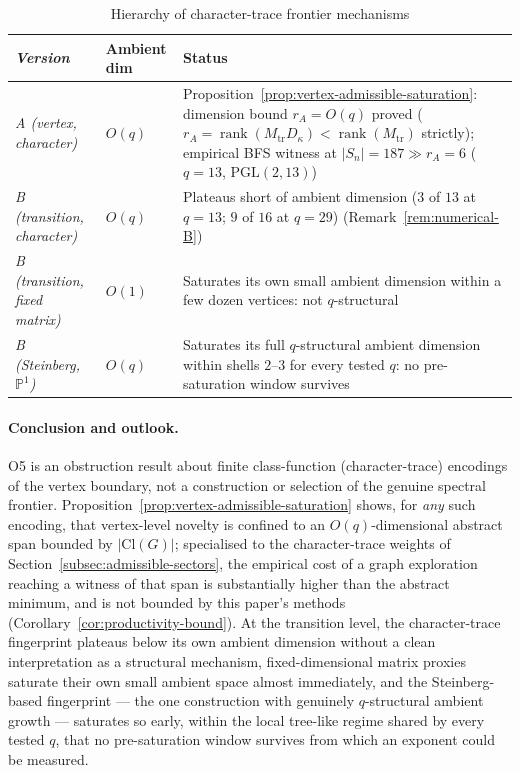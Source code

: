 \documentclass[11pt,a4paper]{article}
\theoremstyle{plain}
\theoremstyle{definition}
\theoremstyle{remark}
\newcommand{\Cl}{\mathrm{Cl}}
\newcommand{\rank}{\operatorname{rank}}
\newcommand{\adm}{\mathrm{tr}}
\begin{document}
      \begin{table}[ht]
        \centering
        \caption{Hierarchy of character-trace frontier mechanisms}
        \label{tab:mechanisms}
        \begin{tabular}{>{\itshape}l l p{7.5cm}}
          \toprule
          Version & Ambient dim & Status \\
          \midrule
          A (vertex, character) & $O(q)$ &
          Proposition~\ref{prop:vertex-admissible-saturation}: dimension bound $r_A=O(q)$ proved
          ($r_A=\rank(M_{\adm}D_\kappa) < \rank(M_{\adm})$ strictly);
          empirical BFS witness at $|S_n|=187 \gg r_A=6$ ($q=13$, $\mathrm{PGL}(2,13)$) \\
          B (transition, character) & $O(q)$ &
          Plateaus short of ambient dimension ($3$ of $13$ at $q=13$; $9$ of $16$ at $q=29$)
          (Remark~\ref{rem:numerical-B}) \\
          B (transition, fixed matrix) & $O(1)$ &
          Saturates its own small ambient dimension within a few dozen vertices: not
          $q$-structural \\
          B (Steinberg, $\mathbb{P}^1$) & $O(q)$ &
          Saturates its full $q$-structural ambient dimension within shells $2$--$3$ for every
          tested $q$: no pre-saturation window survives \\
          \bottomrule
        \end{tabular}
      \end{table}

      \paragraph{Conclusion and outlook.}
        O5 is an obstruction result about finite class-function (character-trace) encodings of the
        vertex boundary, not a construction or selection of the genuine spectral frontier.
        Proposition~\ref{prop:vertex-admissible-saturation} shows, for \emph{any} such encoding,
        that vertex-level novelty is confined to an $O(q)$-dimensional abstract span bounded by
        $|\Cl(G)|$; specialised to the character-trace weights of
        Section~\ref{subsec:admissible-sectors}, the empirical cost of a graph exploration reaching a
        witness of that span is substantially higher than the abstract minimum, and is not bounded by
        this paper's methods (Corollary~\ref{cor:productivity-bound}).
        At the transition level, the character-trace fingerprint plateaus below its own ambient
        dimension without a clean interpretation as a structural mechanism, fixed-dimensional matrix
        proxies saturate their own small ambient space almost immediately, and the Steinberg-based
        fingerprint --- the one construction with genuinely $q$-structural ambient growth ---
        saturates so early, within the local tree-like regime shared by every tested $q$, that no
        pre-saturation window survives from which an exponent could be measured.
\end{document}

